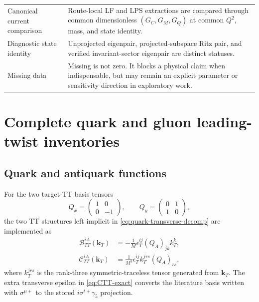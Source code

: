 \documentclass[11pt,oneside]{book}
\newcommand{\kT}{\bm{k}_{T}}
\begin{document}
\begin{longtable}{p{}p{}}
Canonical current comparison&Route-local LF and LPS extractions are compared through common dimensionless $(G_C,G_M,G_Q)$ at common $Q^2$, mass, and state identity.\\
Diagnostic state identity&Unprojected eigenpair, projected-subspace Ritz pair, and verified invariant-sector eigenpair are distinct statuses.\\
Missing data&Missing is not zero.  It blocks a physical claim when indispensable, but may remain an explicit parameter or sensitivity direction in exploratory work.\\
\bottomrule
\end{longtable}

\chapter{Complete quark and gluon leading-twist inventories}
\label{app:inventories}

\section{Quark and antiquark functions}
\label{app:quark-basis}

For the two target-TT basis tensors
\begin{equation}
 Q_x=\begin{pmatrix}1&0\\0&-1\end{pmatrix},
 \qquad
 Q_y=\begin{pmatrix}0&1\\1&0\end{pmatrix},
\end{equation}
the two TT structures left implicit in \cref{eq:quark-transverse-decomp} are implemented as
\begin{align}
 \mathcal B_{TT}^{iA}(\kT)
 &=-\frac{1}{M}\epsilon_T^{ij}(Q_A)_{jk}k_T^k,
 \label{eq:BTT-exact}\\
 \mathcal C_{TT}^{iA}(\kT)
 &=\frac{1}{M^3}\epsilon_T^{ij}k_T^{jrs}(Q_A)_{rs},
 \label{eq:CTT-exact}
\end{align}
where $k_T^{jrs}$ is the rank-three symmetric-traceless tensor generated from $\kT$.  The extra transverse epsilon in \cref{eq:CTT-exact} converts the literature basis written with $\sigma^{\mu+}$ to the stored $i\sigma^{i+}\gamma_5$ projection.
\end{document}
